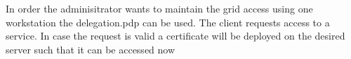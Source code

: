 In order the adminisitrator wants to maintain the grid access using one workstation the delegation.pdp can be used.
The client requests access to a service. In case the request is valid a certificate will be deployed on the desired server such that it can be accessed now  \cite{QIANG_2008}\\



















